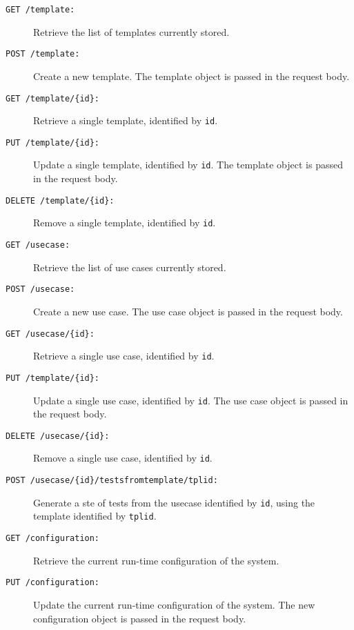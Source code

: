\begin{description}
  \item[\texttt{GET /template:}] Retrieve the list of templates currently stored.

  \item[\texttt{POST /template:}] Create a new template. The template object is passed in the request body.

  \item[\texttt{GET /template/\{id\}:}] Retrieve a single template, identified by \texttt{id}.

  \item[\texttt{PUT /template/\{id\}:}] Update a single template, identified by \texttt{id}. The template object is passed in the request body.

  \item[\texttt{DELETE /template/\{id\}:}] Remove a single template, identified by \texttt{id}.

  \item[\texttt{GET /usecase:}] Retrieve the list of use cases currently stored.

  \item[\texttt{POST /usecase:}] Create a new use case. The use case object is passed in the request body.

  \item[\texttt{GET /usecase/\{id\}:}] Retrieve a single use case, identified by \texttt{id}.

  \item[\texttt{PUT /template/\{id\}:}] Update a single use case, identified by \texttt{id}. The use case object is passed in the request body.

  \item[\texttt{DELETE /usecase/\{id\}:}] Remove a single use case, identified by \texttt{id}.
  
  \item[\texttt{POST /usecase/\{id\}/testsfromtemplate{}/{tplid}:}] Generate a ste of tests from the usecase identified by \texttt{id}, using the template identified by \texttt{tplid}.

  \item[\texttt{GET /configuration:}] Retrieve the current run-time configuration of the system.

  \item[\texttt{PUT /configuration:}] Update the current run-time configuration of the system. The new configuration object is passed in the request body.

\end{description}
